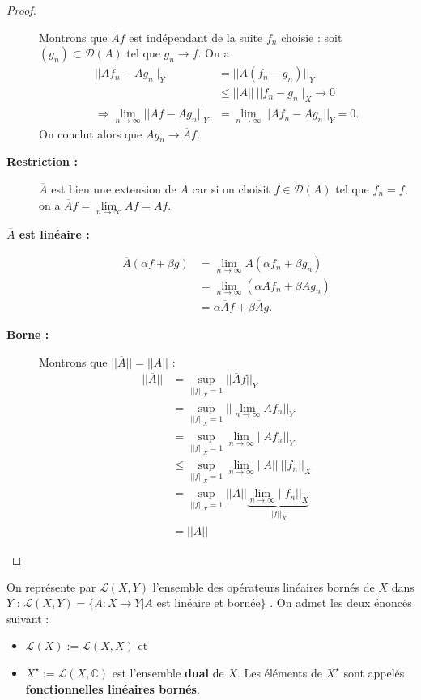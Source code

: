 \begin{proof}
\begin{description}
        Montrons que $\overline{A}f$ est indépendant de la suite $f_n$ choisie : soit $(g_n)\subset\mathcal{D}(A)$ tel que $g_n \to f$. On a
        \begin{align*}
            ||Af_n - Ag_n||_Y & = ||A(f_n - g_n)||_Y \\
            & \leq ||A||\ ||f_n - g_n||_X \to 0 \\
            \Rightarrow \lim \limits_{n\to \infty}||\overline{A}f - Ag_n||_Y & = \lim \limits_{n\to \infty}||Af_n - Ag_n||_Y = 0.
        \end{align*}
        On conclut alors que $Ag_n\to\overline{A}f$.
        \item[\textbf{Restriction :}] $\overline{A}$ est bien une extension de $A$ car si on choisit $f \in \mathcal{D}(A)$ tel que $f_n = f$, on a $\overline{A}f = \lim \limits_{n \to\infty} Af = Af$.
        \item[\textbf{$\overline{A}$ est linéaire :}]
        \begin{align*}
            \overline{A}(\alpha f + \beta g) & = \lim_{n\to\infty} A(\alpha f_n + \beta g_n) \\ & = \lim_{n\to\infty} (\alpha A f_n + \beta A g_n) \\
            & = \alpha\overline{A} f + \beta\overline{A} g.
        \end{align*}
        \item[\textbf{Borne :}] Montrons que $||\overline{A}|| = ||A||$ :
        \begin{align*}
            ||\overline{A}|| & = \sup_{||f||_X=1} ||\overline{A}f||_Y \\ & = \sup_{||f||_X=1} ||\lim_{n\to\infty}Af_n||_Y \\
            & = \sup_{||f||_X=1} \lim_{n\to\infty}||Af_n||_Y \\ & \leq \sup_{||f||_X=1} \lim_{n\to\infty}||A||\ ||f_n||_X \\
            & = \sup_{||f||_X=1}||A|| \underbrace{\lim_{n\to\infty} ||f_n||_X}_{||f||_X} \\
            & = ||A||
        \end{align*}
    \end{description}
\end{proof}

\begin{definition}
    On représente par $\mathcal{L}(X,Y)$ l'ensemble des opérateurs linéaires bornés de $X$ dans $Y$ : $\mathcal{L}(X,Y) = \{A:X \to Y | A$ est linéaire et bornée$\}$ . On admet les deux énoncés suivant :
    \begin{itemize}
        \item $\mathcal{L}(X) := \mathcal{L}(X,X)$ et
        \item $X^\star := \mathcal{L}(X,\mathbb{C})$ est l'ensemble \textbf{dual} de $X$. Les éléments de $X^\star$ sont appelés \textbf{fonctionnelles linéaires bornés}.
    \end{itemize}
\end{definition}

